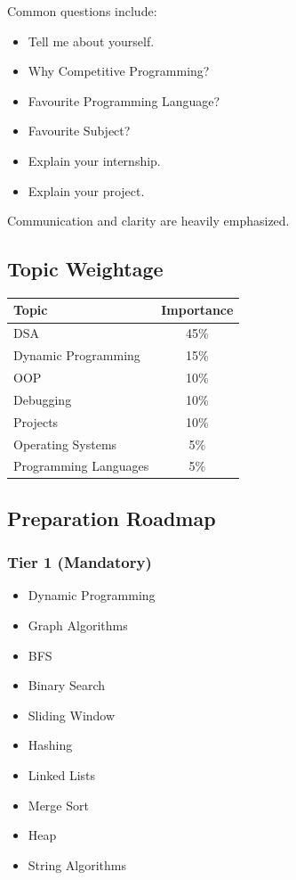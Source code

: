 \documentclass[11pt,a4paper]{article}
\begin{document}
Common questions include:

\begin{itemize}
	\item Tell me about yourself.
	\item Why Competitive Programming?
	\item Favourite Programming Language?
	\item Favourite Subject?
	\item Explain your internship.
	\item Explain your project.
\end{itemize}

Communication and clarity are heavily emphasized.


\subsection{Topic Weightage}

\begin{center}
	\begin{tabular}{|l|c|}
		\hline
		Topic & Importance \\
		\hline
		DSA & 45\% \\
		Dynamic Programming & 15\% \\
		OOP & 10\% \\
		Debugging & 10\% \\
		Projects & 10\% \\
		Operating Systems & 5\% \\
		Programming Languages & 5\% \\
		\hline
	\end{tabular}
\end{center}


\subsection{Preparation Roadmap}

\subsubsection{Tier 1 (Mandatory)}

\begin{itemize}
	\item Dynamic Programming
	\item Graph Algorithms
	\item BFS
	\item Binary Search
	\item Sliding Window
	\item Hashing
	\item Linked Lists
	\item Merge Sort
	\item Heap
	\item String Algorithms
\end{itemize}
\end{document}
